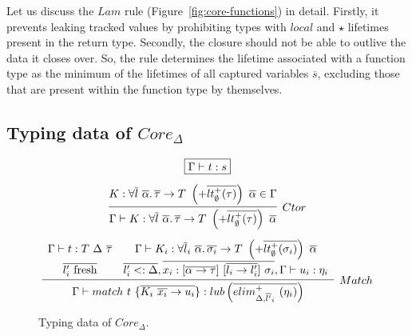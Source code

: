 \documentclass[11pt]{article}
\newcommand{\mathframebox}[1]{\framebox{$\displaystyle #1$}}
\newcommand{\ap}{~}
\begin{document}
    Let us discuss the $Lam$ rule (Figure\ \ref{fig:core-functions}) in detail.
    Firstly, it prevents leaking tracked values by prohibiting types with $local$ and $\star$ lifetimes present in the return type.
    Secondly, the closure should not be able to outlive the data it closes over.
    So, the rule determines the lifetime associated with a function type as the minimum of the lifetimes of all captured variables $\overline{s}$, excluding those that are present within the function type by themselves. %

    \subsection{Typing data of $Core_\Delta$}

    \begin{figure}
        \begin{gather*}
            \mathframebox{\Gamma\vdash t : s} \\[0.5em]
            \infer[Ctor]{\Gamma\vdash K : \forall\overline{l}\ \overline{\alpha}\ldotp \overline{\tau}\to T \ap\left(+\overline{lt_\emptyset^+(\tau)}\right)\ap \overline{\alpha}}{K : \forall\overline{l}\ \overline{\alpha}\ldotp \overline{\tau}\to T \ap\left(+\overline{lt_\emptyset^+(\tau)}\right)\ap \overline{\alpha} \in \Gamma} \\[0.5em]
            \infer[Match]{
                \Gamma\vdash match ~ t ~\{ \overline{K_i\ap \overline{x_{i}} \to u_i }\}  : lub\left(\overline{elim_{\Delta, \overline{l'}_i}^+\ap(\eta_i)}\right)
            }{
                \begin{array}{cc}
                    \Gamma\vdash t : T\ap\Delta \ap\overline{\tau}
                    &
                    \Gamma\vdash K_i : \forall \overline{l}_i~\overline{\alpha}\ldotp \overline{\sigma_{i}} \to T\ap\left(+\overline{lt_\emptyset^+(\sigma_i)}\right)\ap\overline{\alpha}
                    \\[0.4em]
                    \overline{l_i' \text{ fresh}}
                    &
                    \overline{l_i' <: \Delta}, \overline{x_i : [\overline{\alpha\to\tau}]\ap[\overline{l_i\to l_i'}]\ap\sigma_i}, \Gamma \vdash u_i : \eta_i
                \end{array}
            }
        \end{gather*}
        \caption{Typing data of $Core_{\Delta}$.}
        \label{fig:core-data-typing}
    \end{figure}
\end{document}
